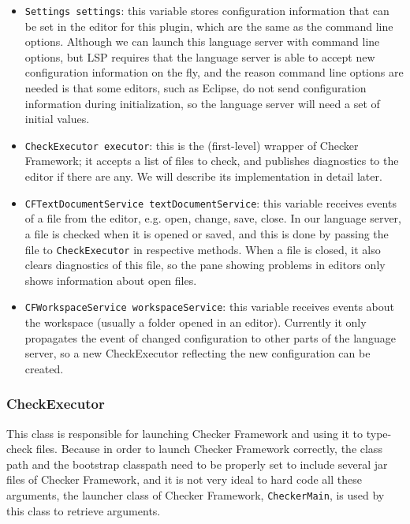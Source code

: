 \documentclass{article}
\begin{document}
\begin{itemize}
    \item \verb|Settings settings|: this variable stores configuration
      information that can be set in the editor for this plugin, which are the
      same as the command line options. Although we can launch this language
      server with command line options, but LSP requires that the language
      server is able to accept new configuration information on the fly, and the
      reason command line options are needed is that some editors, such as
      Eclipse, do not send configuration information during initialization, so
      the language server will need a set of initial values.

    \item \verb|CheckExecutor executor|: this is the (first-level) wrapper of
      Checker Framework; it accepts a list of files to check, and publishes
      diagnostics to the editor if there are any. We will describe its
      implementation in detail later.

    \item \verb|CFTextDocumentService textDocumentService|: this variable
      receives events of a file from the editor, e.g. open, change, save, close.
      In our language server, a file is checked when it is opened or saved, and
      this is done by passing the file to \verb|CheckExecutor| in respective
      methods. When a file is closed, it also clears diagnostics of this file,
      so the pane showing problems in editors only shows information about open
      files.

    \item \verb|CFWorkspaceService workspaceService|: this variable receives
      events about the workspace (usually a folder opened in an editor).
      Currently it only propagates the event of changed configuration to other
      parts of the language server, so a new CheckExecutor reflecting the new
      configuration can be created.
\end{itemize}

\subsubsection{CheckExecutor}

This class is responsible for launching Checker Framework and using it to
type-check files. Because in order to launch Checker Framework correctly, the
class path and the bootstrap classpath need to be properly set to include
several jar files of Checker Framework, and it is not very ideal to hard code
all these arguments, the launcher class of Checker Framework,
\verb|CheckerMain|, is used by this class to retrieve arguments.
\end{document}
